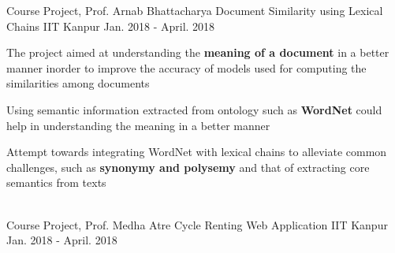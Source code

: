 \vspace{-0.2cm}
\begin{cventries}
    \cventry
    {Course Project, Prof. Arnab Bhattacharya}
    {Document Similarity using Lexical Chains}
    {IIT Kanpur}
    {Jan. 2018 - April. 2018}
    {
      \begin{cvitems}
        \item {The project aimed at understanding the \textbf{meaning of a document} in a better manner inorder to improve the accuracy of models used for computing the similarities among documents}
        \item{Using semantic information extracted from ontology such as \textbf{WordNet} could help in understanding the meaning in a better manner}
        \item{Attempt towards integrating WordNet with lexical chains to alleviate common challenges, such as \textbf{synonymy and polysemy} and that of extracting core semantics from texts}
      \end{cvitems}
    }\\
    \vspace{2mm}
    \cventry
    {Course Project, Prof. Medha Atre}
    {Cycle Renting Web Application}
    {IIT Kanpur}
    {Jan. 2018 - April. 2018}
    {
      \begin{cvitems}

\end{cvitems}}
\end{cventries}
